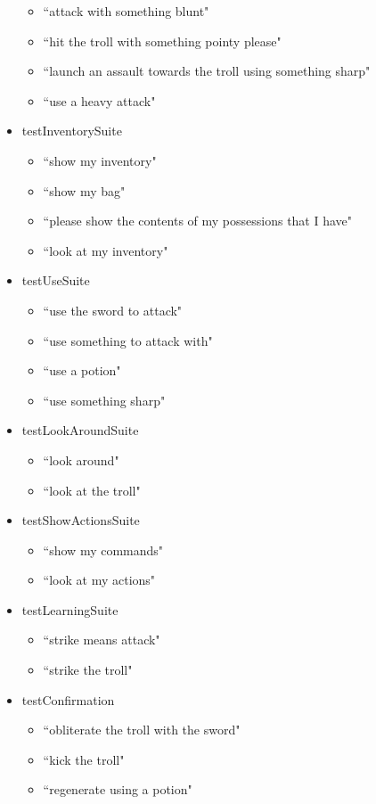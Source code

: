 \documentclass[11pt]{article}
\begin{document}
\begin{appendices}
\begin{scriptsize}
\begin{itemize}
\begin{itemize}
	\item ``attack with something blunt"
	\item ``hit the troll with something pointy please"
	\item ``launch an assault towards the troll using something sharp"
	\item ``use a heavy attack"
	\end{itemize}
\item testInventorySuite
	\begin{itemize}
	\item ``show my inventory"
	\item ``show my bag"
	\item ``please show the contents of my possessions that I have"
	\item ``look at my inventory"
	\end{itemize}
\item testUseSuite
	\begin{itemize}
	\item ``use the sword to attack"
	\item ``use something to attack with"
	\item ``use a potion"
	\item ``use something sharp"
	\end{itemize}
\item testLookAroundSuite
	\begin{itemize}
	\item ``look around"
	\item ``look at the troll"
	\end{itemize}
\item testShowActionsSuite
	\begin{itemize}
	\item ``show my commands"
	\item ``look at my actions"
	\end{itemize}
\item testLearningSuite
	\begin{itemize}
	\item ``strike means attack"
	\item ``strike the troll"
	\end{itemize}
\item testConfirmation
	\begin{itemize}
	\item ``obliterate the troll with the sword"
	\item ``kick the troll"
	\item ``regenerate using a potion"

\end{itemize}
\end{itemize}
\end{scriptsize}
\end{appendices}
\end{document}
